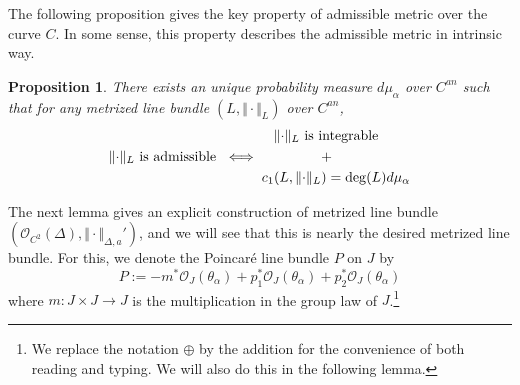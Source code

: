 \documentclass[reqno,11pt]{amsart}
\numberwithin{equation}{section}
\theoremstyle{plain}
\newtheorem{proposition}[theorem]{Proposition}
\theoremstyle{plain}
\numberwithin{equation}{section}
\theoremstyle{remark}
\DeclareMathOperator{\Id}{\operatorname{Id}}
\newcommand{\norm}[1]{\Vert{#1}\Vert}
\begin{document}
The following proposition gives the key property of admissible metric over the curve $C$. In some sense, this property describes the admissible metric in intrinsic way.
\begin{proposition}
There exists an unique probability measure $d\mu_{\alpha}$ over $C^{an}$ such that for any metrized line bundle $(L,\norm{\cdot}_L)$ over $C^{an}$,
$$\norm{\cdot}_L \text{ is admissible } \iff \begin{aligned}
&\hspace{0.3cm}\norm{\cdot}_L \text{ is integrable}\\
&\hspace{1.5cm}+\\
& c_1(L,\norm{\cdot}_L)= \deg (L) d\mu_{\alpha}
\end{aligned}$$
\end{proposition}
The next lemma gives an explicit construction of metrized line bundle $(\mathcal{O}_{C^2}(\Delta),\norm{\cdot}_{\Delta,a}')$, and we will see that this is nearly the desired metrized line bundle. For this, we denote the Poincaré line bundle $P$ on $J$ by
$$P:=-m^*\mathcal{O}_{J}(\theta_{\alpha})+p_1^*\mathcal{O}_{J}(\theta_{\alpha})+p_2^*\mathcal{O}_{J}(\theta_{\alpha})$$
where $m:J \times J\longrightarrow J$ is the multiplication in the group law of $J$.\footnote{We replace the notation $\oplus$ by the addition for the convenience of both reading and typing. We will also do this in the following lemma.}
\begin{center}
\end{center}
\end{document}
